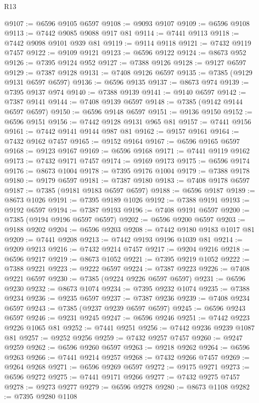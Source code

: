 \begin{lexlean}{R13}
\begin{coremodule}
@9107 := @6596 @9105 @6597
@9108 := @9093 @9107
@9109 := @6596 @9108
@9113 := @7442 @9085 @9088 @917 @81
@9114 := @7441 @9113
@9118 := @7442 @9098 @9101 @939 @81
@9119 := @9114 @9118
@9121 := @7432 @9119 @7457
@9122 := @9109 @9121
@9123 := @6596 @9122
@9124 := @8673 @952
@9126 := @7395 @9124 @952
@9127 := @7388 @9126
@9128 := @9127 @6597
@9129 := @7387 @9128
@9131 := @7408 @9126 @6597
@9135 := @7385 (@9129 @9131 @6597 @6597)
@9136 := @6596 @9135
@9137 := @8673 @974
@9139 := @7395 @9137 @974
@9140 := @7388 @9139
@9141 := @9140 @6597
@9142 := @7387 @9141
@9144 := @7408 @9139 @6597
@9148 := @7385 (@9142 @9144 @6597 @6597)
@9150 := @6596 @9148 @6597
@9151 := @9136 @9150
@9152 := @6596 @9151
@9156 := @7442 @9128 @9131 @965 @81
@9157 := @7441 @9156
@9161 := @7442 @9141 @9144 @987 @81
@9162 := @9157 @9161
@9164 := @7432 @9162 @7457
@9165 := @9152 @9164
@9167 := @6596 @9165 @6597
@9168 := @9123 @9167
@9169 := @6596 @9168
@9171 := @7441 @9119 @9162
@9173 := @7432 @9171 @7457
@9174 := @9169 @9173
@9175 := @6596 @9174
@9176 := @8673 @1004
@9178 := @7395 @9176 @1004
@9179 := @7388 @9178
@9180 := @9179 @6597
@9181 := @7387 @9180
@9183 := @7408 @9178 @6597
@9187 := @7385 (@9181 @9183 @6597 @6597)
@9188 := @6596 @9187
@9189 := @8673 @1026
@9191 := @7395 @9189 @1026
@9192 := @7388 @9191
@9193 := @9192 @6597
@9194 := @7387 @9193
@9196 := @7408 @9191 @6597
@9200 := @7385 (@9194 @9196 @6597 @6597)
@9202 := @6596 @9200 @6597
@9203 := @9188 @9202
@9204 := @6596 @9203
@9208 := @7442 @9180 @9183 @1017 @81
@9209 := @7441 @9208
@9213 := @7442 @9193 @9196 @1039 @81
@9214 := @9209 @9213
@9216 := @7432 @9214 @7457
@9217 := @9204 @9216
@9218 := @6596 @9217
@9219 := @8673 @1052
@9221 := @7395 @9219 @1052
@9222 := @7388 @9221
@9223 := @9222 @6597
@9224 := @7387 @9223
@9226 := @7408 @9221 @6597
@9230 := @7385 (@9224 @9226 @6597 @6597)
@9231 := @6596 @9230
@9232 := @8673 @1074
@9234 := @7395 @9232 @1074
@9235 := @7388 @9234
@9236 := @9235 @6597
@9237 := @7387 @9236
@9239 := @7408 @9234 @6597
@9243 := @7385 (@9237 @9239 @6597 @6597)
@9245 := @6596 @9243 @6597
@9246 := @9231 @9245
@9247 := @6596 @9246
@9251 := @7442 @9223 @9226 @1065 @81
@9252 := @7441 @9251
@9256 := @7442 @9236 @9239 @1087 @81
@9257 := @9252 @9256
@9259 := @7432 @9257 @7457
@9260 := @9247 @9259
@9262 := @6596 @9260 @6597
@9263 := @9218 @9262
@9264 := @6596 @9263
@9266 := @7441 @9214 @9257
@9268 := @7432 @9266 @7457
@9269 := @9264 @9268
@9271 := @6596 @9269 @6597
@9272 := @9175 @9271
@9273 := @6596 @9272
@9275 := @7441 @9171 @9266
@9277 := @7432 @9275 @7457
@9278 := @9273 @9277
@9279 := @6596 @9278
@9280 := @8673 @1108
@9282 := @7395 @9280 @1108

\end{coremodule}
\end{lexlean}
